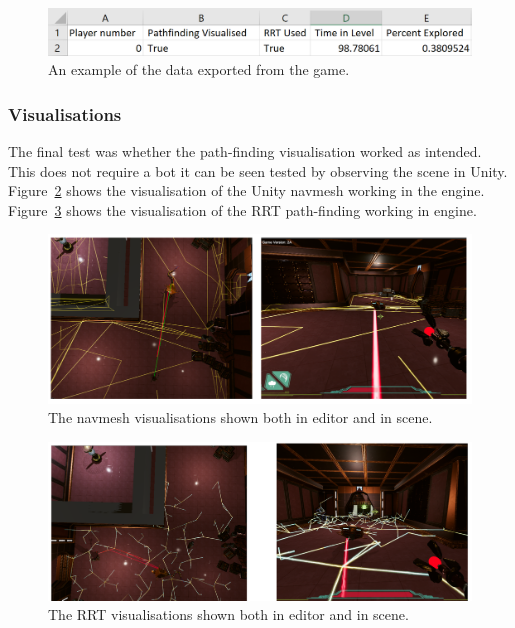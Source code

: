 \documentclass[journal]{IEEEtran}
\begin{document}
	\begin{figure}[h]
		\includegraphics[width=1.0\linewidth]{ExportData.png}
		\caption{An example of the data exported from the game.}
		\label{image:ExportData}
	\end{figure} 
	
	\subsubsection{Visualisations}
	The final test was whether the path-finding visualisation worked as intended. This does not require a bot it can be seen tested by observing the scene in Unity. Figure~\ref{image:navmeshVisuals} shows the visualisation of the Unity navmesh working in the engine.  Figure~\ref{image:RRTVisuals} shows the visualisation of the RRT path-finding working in engine.
	
	\begin{figure}[h]
		\includegraphics[width=1.0\linewidth]{NavmeshVis.png}
		\caption{The navmesh visualisations shown both in editor and in scene.}
		\label{image:navmeshVisuals}
	\end{figure}  
	
	
	\begin{figure}[h]
		\includegraphics[width=1.0\linewidth]{RRTVis.png}
		\caption{The RRT visualisations shown both in editor and in scene.}
		\label{image:RRTVisuals}
	\end{figure}  
	
\end{document}
